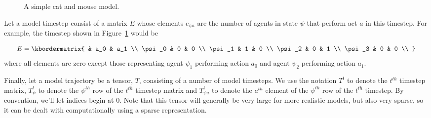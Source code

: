 \documentclass{article}
\begin{document}
\begin{figure}
	\centering
	\caption{A simple cat and mouse model.\label{fig:AB-MCMC-1}}
\end{figure}


Let a model timestep consist of a matrix $E$ whose elements $e_{\psi a}$ are the number of agents in state $\psi$ that perform act $a$ in this timestep. For example, the timestep shown in Figure~\ref{fig:AB-MCMC-1} would be

\[
E = \kbordermatrix{
	& a_0 & a_1 \\
	\psi_0 & 0 & 0 \\
	\psi_1 & 1 & 0 \\
	\psi_2 & 0  & 1 \\
	\psi_3 & 0 & 0 \\
}
\]
where all elements are zero except those representing agent $\psi_1$ performing action $a_0$ and agent $\psi_2$ performing action $a_1$.


Finally, let a model trajectory be a tensor, $T$, consisting of a number of model timesteps. We use the notation $T^t$ to denote the $t^{th}$ timestep matrix, $T^t_\psi$ to denote the $\psi^{th}$ row of the $t^{th}$ timestep matrix and $T^t_{\psi a}$ to denote the $a^{th}$ element of the $\psi^{th}$ row of the $t^{th}$ timestep. By convention, we'll let indices begin at 0. Note that this tensor will generally be very large for more realistic models, but also very sparse, so it can be dealt with computationally using a sparse representation.
\end{document}
